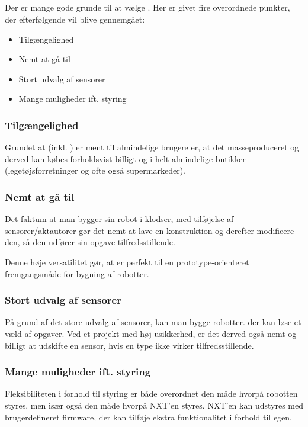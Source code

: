 \subsection{\legoms}
Der er mange gode grunde til at vælge \legoms.
Her er givet fire overordnede punkter, der efterfølgende vil blive gennemgået:

\begin{itemize}
\item{Tilgængelighed}
\item{Nemt at gå til}
\item{Stort udvalg af sensorer}
\item{Mange muligheder ift. styring}
\end{itemize}

\subsubsection{Tilgængelighed}
Grundet at \lego (inkl. \legoms) er ment til almindelige brugere er, at det masseproduceret og derved kan købes forholdsvist billigt og i helt almindelige butikker (legetøjsforretninger og ofte også supermarkeder).

\subsubsection{Nemt at gå til}
Det faktum at man bygger sin robot i \lego klodser, med tilføjelse af \legoms sensorer/aktautorer gør det nemt at lave en konstruktion og derefter modificere den, så den udfører sin opgave tilfredsstillende.

Denne høje versatilitet gør, at \lego er perfekt til en prototype-orienteret fremgangsmåde for bygning af robotter.

\subsubsection{Stort udvalg af sensorer}
På grund af det store udvalg af sensorer, kan man bygge robotter. der kan løse et væld af opgaver.
Ved et projekt med høj usikkerhed, er det derved også nemt og billigt at udskifte en sensor, hvis en type ikke virker tilfredsstillende.

\subsubsection{Mange muligheder ift. styring}
Fleksibiliteten i forhold til styring er både overordnet den måde hvorpå robotten styres, men især også den måde hvorpå NXT'en styres.
NXT'en kan udstyres med brugerdefineret firmware, der kan tilføje ekstra funktionalitet i forhold til \legos egen.

